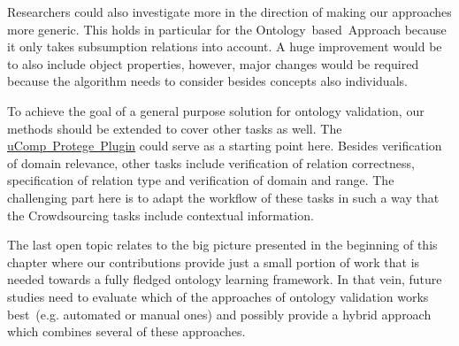 Researchers could also investigate more in the direction of making our approaches more generic. This holds in particular for the Ontology~based~Approach because it only takes subsumption relations into account. A huge improvement would be to also include object properties, however, major changes would be required because the algorithm needs to consider besides concepts also individuals. 

To achieve the goal of a general purpose solution for ontology validation, our methods should be extended to cover other tasks as well.
The \hyperref[sec:ucomp_protege_plugin]{uComp~Protege~Plugin} could serve as a starting point here. Besides verification of domain relevance, other tasks include verification of relation correctness, specification of relation type and verification of domain and range. The challenging part here is to adapt the workflow of these tasks in such a way that the Crowdsourcing tasks include contextual information. 

The last open topic relates to the big picture presented in the beginning of this chapter where our contributions provide just a small portion of work that is needed towards a fully fledged ontology learning framework. In that vein, future studies need to evaluate which of the approaches of ontology validation works best~(e.g. automated or manual ones) and possibly provide a hybrid approach which combines several of these approaches.



